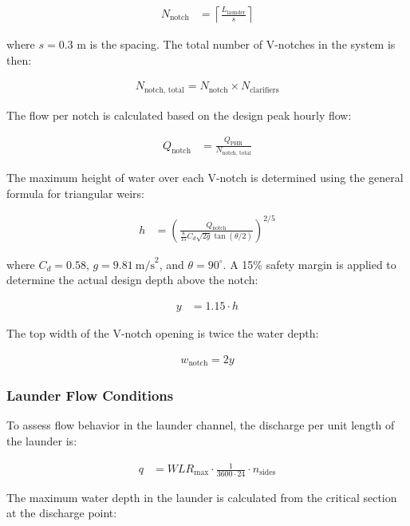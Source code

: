 \documentclass[12pt]{article}
\begin{document}
\begin{align}
N_{\text{notch}} &= \left\lceil \frac{L_{\text{launder}}}{s} \right\rceil
\end{align}

where \( s = 0.3 \) m is the spacing. The total number of V-notches in the system is then:

\begin{align}
N_{\text{notch, total}} = N_{\text{notch}} \times N_{\text{clarifiers}}
\end{align}

The flow per notch is calculated based on the design peak hourly flow:

\begin{align}
Q_{\text{notch}} &= \frac{Q_{\text{PHR}}}{N_{\text{notch, total}}}
\end{align}

The maximum height of water over each V-notch is determined using the general formula for triangular weirs:

\begin{align}
h &= \left( \frac{Q_{\text{notch}}}{\frac{8}{15} C_d \sqrt{2g} \tan(\theta/2)} \right)^{2/5}
\label{eq:vnotch_height}
\end{align}

where \( C_d = 0.58 \), \( g = 9.81~\text{m/s}^2 \), and \( \theta = 90^\circ \). A 15\% safety margin is applied to determine the actual design depth above the notch:

\begin{align}
y &= 1.15 \cdot h
\end{align}

The top width of the V-notch opening is twice the water depth:

\begin{align}
w_{\text{notch}} = 2y
\end{align}

\subsubsection{Launder Flow Conditions}

To assess flow behavior in the launder channel, the discharge per unit length of the launder is:

\begin{align}
q &= WLR_{\text{max}} \cdot \frac{1}{3600 \cdot 24} \cdot n_{\text{sides}}
\end{align}

The maximum water depth in the launder is calculated from the critical section at the discharge point:
\end{document}
